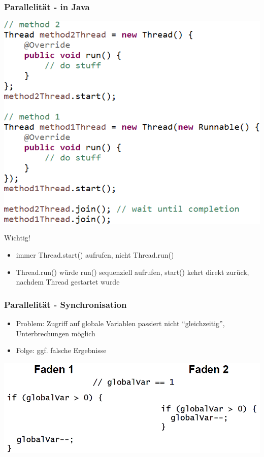 \documentclass[18pt]{beamer}
\begin{document}
	\begin{frame}
		\frametitle{Parallelität - in Java}
		\centering
		\includegraphics[scale=0.43]{./pics/tut5/crea-thr-java.png}
		\pause
		\begin{alertblock}{Wichtig!}
			\begin{itemize}
				\item immer Thread.start() aufrufen, nicht Thread.run() \pause
				\item Thread.run() würde run() sequenziell aufrufen, start() kehrt direkt zurück, nachdem Thread gestartet wurde
			\end{itemize}
		\end{alertblock}
	\end{frame}

	\begin{frame}
		\frametitle{Parallelität - Synchronisation}
		\begin{itemize}
			\item Problem: Zugriff auf globale Variablen passiert nicht \enquote{gleichzeitig}, Unterbrechungen möglich
			\item Folge: ggf. falsche Ergebnisse
		\end{itemize}
		\includegraphics[scale=0.43]{./pics/tut5/par-pro.png}
	\end{frame}
\end{document}
